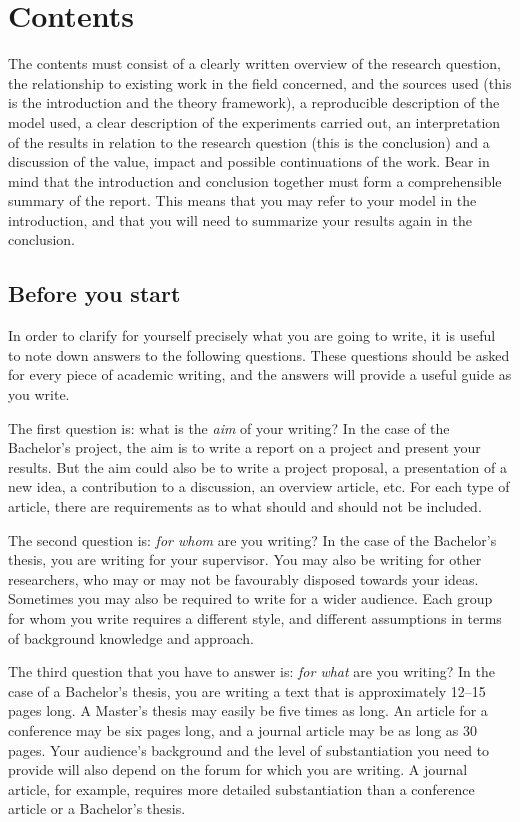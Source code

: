 
\section{Contents}\label{sec:contents}
The contents must consist of a clearly written overview of the research question, the relationship to existing work in the field concerned, and the sources used (this is the introduction and the theory framework), a reproducible description of the model used, a clear description of the experiments carried out, an interpretation of the results in relation to the research question (this is the conclusion) and a discussion of the value, impact and possible continuations of the work.
Bear in mind that the introduction and conclusion together must form a comprehensible summary of the report.
This means that you may refer to your model in the introduction, and that you will need to summarize your results again in the conclusion.

\subsection{Before you start}\label{sec:_before_you_start}
In order to clarify for yourself precisely what you are going to write, it is useful to note down answers to the following questions.
These questions should be asked for every piece of academic writing, and the answers will provide a useful guide as you write.

The first question is: what is the \textit{aim} of your writing?
In the case of the Bachelor's project, the aim is to write a report on a project and present your results.
But the aim could also be to write a project proposal, a presentation of a new idea, a contribution to a discussion, an overview article, etc.
For each type of article, there are requirements as to what should and should not be included.

The second question is: \textit{for whom} are you writing? In the case of the Bachelor's thesis, you are writing for your supervisor.
You may also be writing for other researchers, who may or may not be favourably disposed towards your ideas.
Sometimes you may also be required to write for a wider audience.
Each group for whom you write requires a different style, and different assumptions in terms of background knowledge and approach.

The third question that you have to answer is: \textit{for what} are you writing?
In the case of a Bachelor's thesis, you are writing a text that is approximately 12--15 pages long.
A Master's thesis may easily be five times as long.
An article for a conference may be six pages long, and a journal article may be as long as 30 pages.
Your audience's background and the level of substantiation you need to provide will also depend on the forum for which you are writing.
A journal article, for example, requires more detailed substantiation than a conference article or a Bachelor's thesis.

